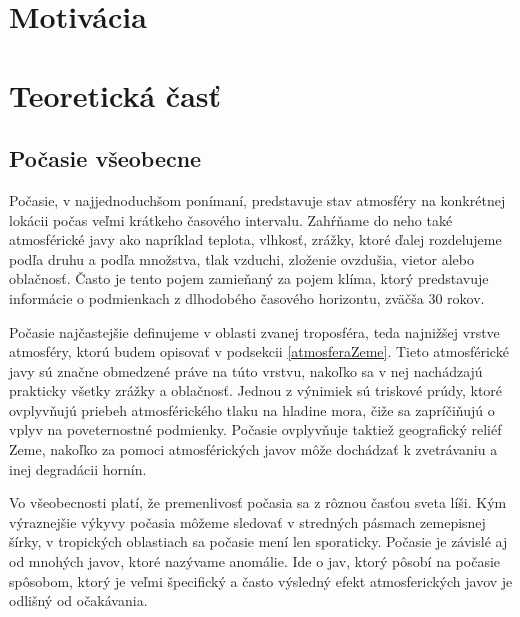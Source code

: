 
\section{Motivácia}

\section{Teoretická časť}

\subsection{Počasie všeobecne}
Počasie, v najjednoduchšom ponímaní, predstavuje stav atmosféry na konkrétnej lokácii počas veľmi krátkeho časového intervalu. Zahŕňame do neho také atmosférické javy ako napríklad teplota, vlhkosť, zrážky, ktoré ďalej rozdelujeme podľa druhu a podľa množstva, tlak vzduchi, zloženie ovzdušia, vietor alebo oblačnosť. Často je tento pojem zamieňaný za pojem klíma, ktorý predstavuje informácie o podmienkach z dlhodobého časového horizontu, zväčša 30 rokov.

Počasie najčastejšie definujeme v oblasti zvanej troposféra, teda najnižšej vrstve atmosféry, ktorú budem opisovať v podsekcii \ref{atmosferaZeme}. Tieto atmosférické javy sú značne obmedzené práve na túto vrstvu, nakoľko sa v nej nachádzajú prakticky všetky zrážky a oblačnosť. Jednou z výnimiek sú triskové prúdy, ktoré ovplyvňujú priebeh atmosférického tlaku na hladine mora, čiže sa zapríčiňujú o vplyv na poveternostné podmienky. Počasie ovplyvňuje taktiež geografický reliéf Zeme, nakoľko za pomoci atmosférických javov môže dochádzať k zvetrávaniu a inej degradácii hornín. 

Vo všeobecnosti platí, že premenlivosť počasia sa z rôznou časťou sveta líši. Kým výraznejšie výkyvy počasia môžeme sledovať v stredných pásmach zemepisnej šírky, v tropických oblastiach sa počasie mení len sporaticky. Počasie je závislé aj od mnohých javov, ktoré nazývame anomálie. Ide o jav, ktorý pôsobí na počasie spôsobom, ktorý je veľmi špecifický a často výsledný efekt atmosferických javov je odlišný od očakávania. 

